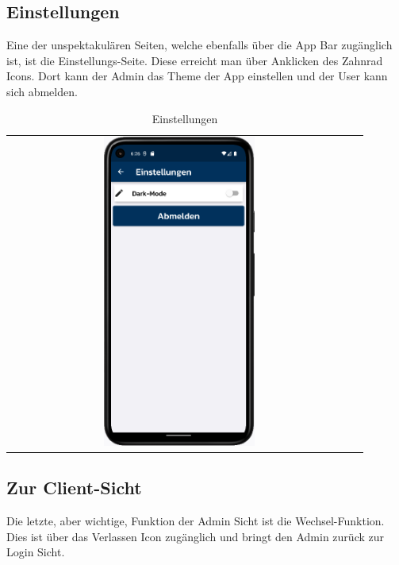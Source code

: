 \newpage

\newpage

\subsection{Einstellungen}
Eine der unspektakulären Seiten, welche ebenfalls über die App Bar zugänglich ist, ist die Einstellungs-Seite. Diese erreicht man über Anklicken des Zahnrad Icons. Dort kann der Admin das Theme der App einstellen und der User kann sich abmelden.

\vspace{1cm}
\begin{table}[htbp]
  \centering
  \begin{tabular}{cc}
    \includegraphics[width=0.45\textwidth]{FLUTTER/images/ZB/settings_page.png} \\
  \end{tabular}
  \label{tab:example}
  \captionsetup{type=figure}
  \caption{Einstellungen}
\end{table}

\newpage

\subsection{Zur Client-Sicht}
Die letzte, aber wichtige, Funktion der Admin Sicht ist die Wechsel-Funktion. Dies ist über das Verlassen Icon zugänglich und bringt den Admin zurück zur Login Sicht.

